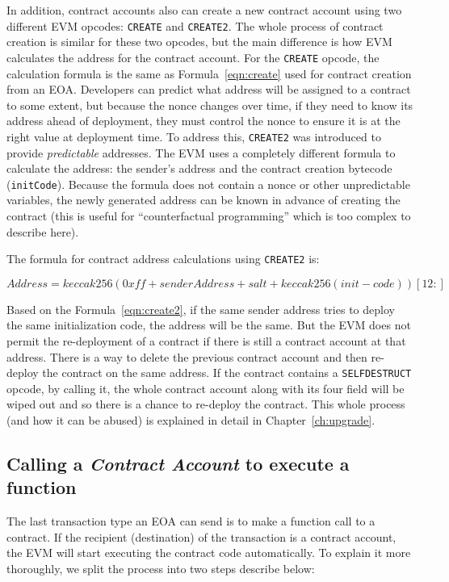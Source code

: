 In addition, contract accounts also can create a new contract account using two different EVM opcodes: \texttt{CREATE} and \texttt{CREATE2}. The whole process of contract creation is similar for these two opcodes, but the main difference is how EVM calculates the address for the contract account. For the \texttt{CREATE} opcode, the calculation formula is the same as Formula~\ref{eqn:create} used for contract creation from an EOA. Developers can predict what address will be assigned to a contract to some extent, but because the nonce changes over time, if they need to know its address ahead of deployment, they must control the nonce to ensure it is at the right value at deployment time. To address this, \texttt{CREATE2} was introduced to provide \emph{predictable} addresses. The EVM uses a completely different formula to calculate the address: the sender's address and the contract creation bytecode (\aka \texttt{initCode}). Because the formula does not contain a nonce or other unpredictable variables, the newly generated address can be known in advance of creating the contract (this is useful for ``counterfactual programming'' which is too complex to describe here). 

The formula for contract address calculations using \texttt{CREATE2} is:

\begin{equation}
    \label{eqn:create2}
    Address = keccak256(0xff + senderAddress + salt + keccak256(init-code))[12:]    
\end{equation}

Based on the Formula~\ref{eqn:create2}, if the same sender address tries to deploy the same initialization code, the address will be the same. But the EVM does not permit the re-deployment of a contract if there is still a contract account at that address. There is a way to delete the previous contract account and then re-deploy the contract on the same address. If the contract contains a \texttt{SELFDESTRUCT} opcode, by calling it, the whole contract account along with its four field will be wiped out and so there is a chance to re-deploy the contract. This whole process (and how it can be abused) is explained in detail in Chapter~\ref{ch:upgrade}. 

\subsection{Calling a \textit{Contract Account} to execute a function}
The last transaction type an EOA can send is to make a function call to a contract. If the recipient (destination) of the transaction is a contract account, the EVM will start executing the contract code automatically. To explain it more thoroughly, we split the process into two steps describe below:

